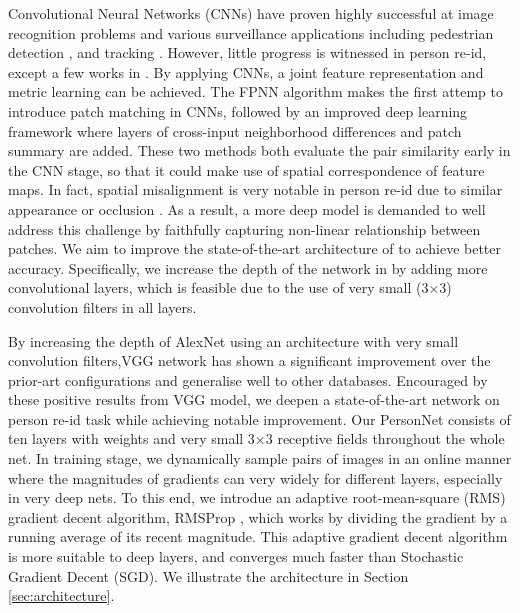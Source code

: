 \documentclass[10pt,journal,twocolumn]{IEEEtran}
\begin{document}
Convolutional Neural Networks (CNNs) have proven highly successful at image recognition problems and various surveillance applications including pedestrian detection \cite{DeepContextDetection,DeepDetection}, and tracking \cite{DeepTracking}. However, little progress is witnessed in person re-id, except a few works in \cite{JointRe-id,FPNN,DeepReID}.  By applying CNNs, a joint feature representation and metric learning can be achieved. The FPNN algorithm \cite{FPNN} makes the first attemp to introduce patch matching in CNNs, followed by an improved deep learning framework \cite{JointRe-id} where layers of cross-input neighborhood differences
and patch summary are added. These two methods both evaluate the pair similarity early in the CNN stage, so that it could make use of spatial correspondence of feature maps. In fact, spatial misalignment is very notable in person re-id due to similar appearance or occlusion \cite{ReID_structure}. As a result, a more deep model is demanded to well address this challenge by faithfully capturing non-linear relationship between patches. We aim to improve the state-of-the-art architecture of \cite{JointRe-id} to achieve better accuracy. Specifically, we increase the depth of the network in \cite{JointRe-id} by adding more convolutional layers, which is feasible due to the use of very small (3$\times$3) convolution filters in all layers.

By increasing the depth of AlexNet \cite{Krizhevsky2012Imagenet} using an architecture with very small convolution filters,VGG network \cite{VGG} has shown a significant improvement over the prior-art configurations and generalise well to other databases. Encouraged by these positive results from VGG model, we deepen a state-of-the-art network \cite{JointRe-id} on person re-id task while achieving notable improvement. Our PersonNet consists of ten layers with weights and very small 3$\times$3 receptive fields throughout the whole net.
In training stage, we dynamically sample pairs of images in an online manner where the magnitudes of gradients can very widely for different layers, especially in very deep nets. To this end, we introdue an adaptive root-mean-square (RMS) gradient decent algorithm, RMSProp \cite{rmsprop,GenerateSeq}, which works by dividing the gradient by a running average of its recent magnitude. This adaptive gradient decent algorithm is more suitable to deep layers, and converges much faster than Stochastic Gradient Decent (SGD).
We illustrate the architecture in Section \ref{sec:architecture}.
\end{document}

